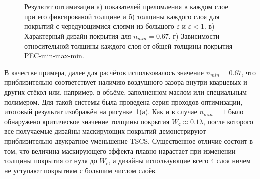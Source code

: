 \begin{figure}[p]
  \begin{minipage}{\linewidth}
  \begin{minipage}{0.49\linewidth}
  \end{minipage}
  \hfill
  \begin{minipage}{0.49\linewidth}
  \end{minipage}
  \end{minipage}\\
  \vspace*{4ex}%
  \\
  \begin{minipage}{\linewidth}
  \begin{minipage}{0.49\linewidth}
  \end{minipage}
  \hfill
  \begin{minipage}{0.49\linewidth}
  \end{minipage}
  \end{minipage}
  \caption{Результат оптимизации а) показателей преломления в каждом
    слое при его фиксированой толщине и б) толщины каждого слоя для
    покрытий с чередующимися слоями из большого $\varepsilon$ и
    ${\varepsilon<1}$. в) Характерный дизайн покрытия для
    $n_{min} = 0.67$. г) Зависимости относительной толщины каждого
    слоя от общей толщины покрытия PEC-min-max-min. }
  \label{img:min-max-min}  
\end{figure}

В качестве примера, далее для расчётов использовалось значение
$n_{min}=0.67$, что приблизительно соответствует наличию воздушного
зазора внутри кварцевых и других стёкол или, например, в объёме,
заполненном маслом или специальным полимером.  Для такой системы была
проведена серия проходов оптимизации, итоговый результат изображён на
рисунке~\ref{img:min-max-min}(а). Как и в случае $n_{min}=1$ было
обнаружено критическое значение толщины покрытия
$W_с\approx 0.1\lambda$, после которого все получаемые дизайны
маскирующих покрытий демонстрируют приблизительно двукратное
уменьшение TSCS. Существенное отличие состоит в том, что величина
маскирующего эффекта плавно нарастает при изменении толщины покрытия
от нуля до $W_c$, а дизайны использующие всего 4 слоя ничем не
уступают покрытиям с большим числом слоёв.

